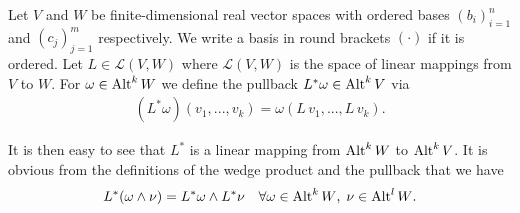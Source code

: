 \documentclass[../master_thesis.tex]{subfiles}
\begin{document}
\begin{definition}
    Let $V$ and $W$ be finite-dimensional real
    vector spaces with ordered bases $(b_i)_{i=1}^n$ and $(c_j)_{j=1}^m$ 
    respectively. We write a basis in round brackets $(\cdot)$ if it is 
    ordered. Let $L \in \mathcal{L}(V,W)$ where $\mathcal{L}(V,W)$ is the 
    space of linear mappings from $V$ to $W$. For $\omega \in {\text{Alt}^{k}\,W}$
    we define the pullback $L^* \omega \in {\text{Alt}^{k}\,V}$ via 
    \begin{align*}
        (L^* \omega)(v_1,...,v_k) = \omega(L\,v_1,...,L\,v_k).
    \end{align*} 
\end{definition}
It is then easy to see that 
$L^*$ is a linear mapping from ${\text{Alt}^{k}\,W}$ to 
${\text{Alt}^{k}\,V}$.
It is obvious from the definitions of the wedge product and 
the pullback that we have 
\begin{align*}
    L^*(\omega \wedge \nu) = L^*\omega \wedge L^* \nu \quad \forall 
        \omega \in {\text{Alt}^{k}\,W}, \; \nu \in {\text{Alt}^{l}\,W}.
\end{align*}
\end{document}
